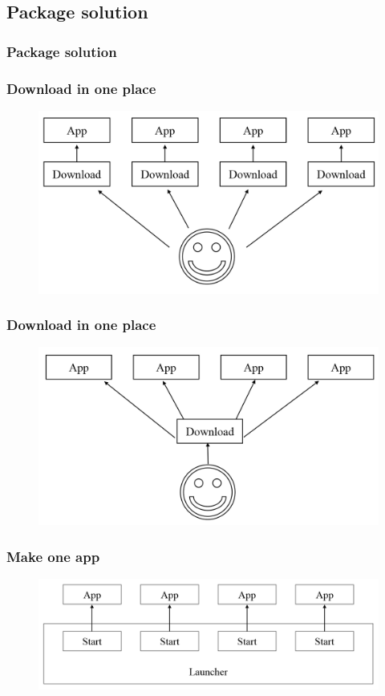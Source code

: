 \subsection{Package solution}
\begin{frame}
	\frametitle{Package solution}
\end{frame}

\begin{frame}
	\begin{center}
		\frametitle{Download in one place}
		\begin{figure}[H]
			\centering
			\includegraphics[width= 0.8 \textwidth]{pictures/MultipleDownload.png}
		\end{figure}
	\end{center}
\end{frame}

\begin{frame}
	\begin{center}
		\frametitle{Download in one place}
		\begin{figure}[H]
			\centering
			\includegraphics[width= 0.8 \textwidth]{pictures/DownloadOnePlace.png}
		\end{figure}
	\end{center}
\end{frame}

\begin{frame}
	\begin{center}
		\frametitle{Make one app}
		\begin{figure}[H]
			\centering
			\includegraphics[width= 0.8 \textwidth]{pictures/OldLauncher.png}
		\end{figure}
	\end{center}
\end{frame}

